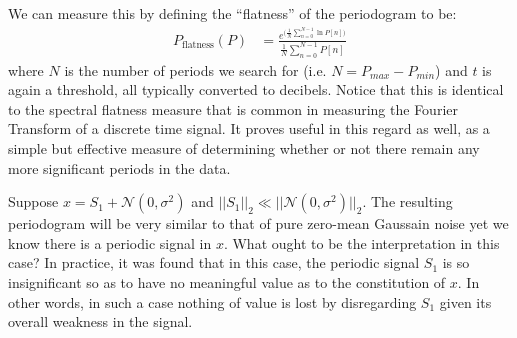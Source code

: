     We can measure this by defining the ``flatness'' of the periodogram to be:
    \begin{align} \label{eq:detection:flatness}
        P_{\text{flatness}}(P) &= \frac
            {
                e^{\big( \frac{1}{N} \sum_{n=0}^{N-1} \ln P[n] \big)}
            }
            {
                \frac{1}{N} \sum_{n=0}^{N-1} P[n]
            }
    \end{align}
    where $N$ is the number of periods we search for (i.e. $N = P_{max} - P_{min}$) and $t$ is again a threshold, all typically converted to decibels. Notice that this is identical to the spectral flatness measure that is common in measuring the Fourier Transform of a discrete time signal. It proves useful in this regard as well, as a simple but effective measure of determining whether or not there remain any more significant periods in the data.

    Suppose $x = S_1 + \mathcal{N}(0, \sigma^2)$ and $||S_1||_2 \ll ||\mathcal{N}(0, \sigma^2)||_2$. The resulting periodogram will be very similar to that of pure zero-mean Gaussain noise yet we know there is a periodic signal in $x$. What ought to be the interpretation in this case? In practice, it was found that in this case, the periodic signal $S_1$ is so insignificant so as to have no meaningful value as to the constitution of $x$. In other words, in such a case nothing of value is lost by disregarding $S_1$ given its overall weakness in the signal.



%
%
%

